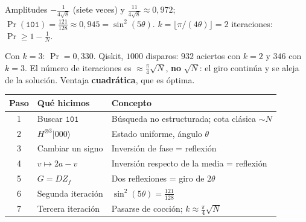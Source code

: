 \documentclass[11pt, a4paper, twoside, openright]{report}
\newcommand{\pasoguiado}[3]{%
\begin{tcolorbox}[colback=gray!6!white,colframe=gray!55!black,title={#1}]
#2
\tcblower
\small #3
\end{tcolorbox}}
\providecommand{\ket}[1]{|#1\rangle}
\begin{document}
\pasoguiado{Paso 6. Segunda iteración}
{Amplitudes $-\frac{1}{4\sqrt8}$ (siete veces) y $\frac{11}{4\sqrt8}\approx0{,}972$; \quad $\Pr(\texttt{101}) = \frac{121}{128}\approx0{,}945 = \sin^2(5\theta)$.}
{$k = \lfloor\pi/(4\theta)\rfloor = 2$ iteraciones: $\Pr\ge1-\frac1N$.}

\pasoguiado{Paso 7. No pasarse}
{Con $k = 3$: $\Pr = 0{,}330$. Qiskit, $1000$ disparos: $932$ aciertos con $k = 2$ y $346$ con $k = 3$.}
{El número de iteraciones es $\approx\frac{\pi}{4}\sqrt N$, \textbf{no} $\sqrt N$: el giro continúa y se aleja de la solución. Ventaja \textbf{cuadrática}, que es óptima.}

\begin{center}
\small\renewcommand{\arraystretch}{1.15}
\begin{tabular}{c|l|l}
\textbf{Paso} & \textbf{Qué hicimos} & \textbf{Concepto} \\ \hline
1 & Buscar $\texttt{101}$ & Búsqueda no estructurada; cota clásica $\sim N$ \\
2 & $H^{\otimes3}\ket{000}$ & Estado uniforme, ángulo $\theta$ \\
3 & Cambiar un signo & Inversión de fase = reflexión \\
4 & $v\mapsto2a - v$ & Inversión respecto de la media = reflexión \\
5 & $G = DZ_f$ & Dos reflexiones = giro de $2\theta$ \\
6 & Segunda iteración & $\sin^2(5\theta) = \frac{121}{128}$ \\
7 & Tercera iteración & Pasarse de cocción; $k\approx\frac{\pi}{4}\sqrt N$
\end{tabular}
\end{center}
\end{document}
